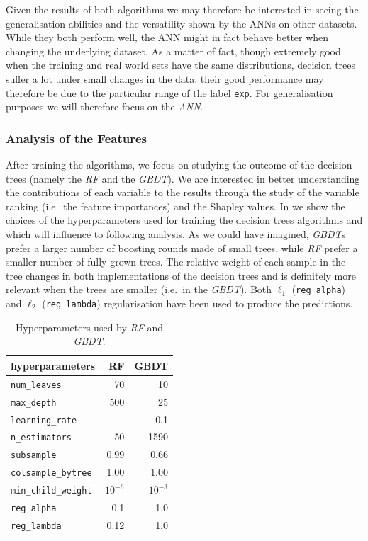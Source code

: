 Given the results of both algorithms we may therefore be interested in seeing the generalisation abilities and the versatility shown by the ANNs on other datasets.
While they both perform well, the ANN might in fact behave better when changing the underlying dataset.
As a matter of fact, though extremely good when the training and real world sets have the same distributions, decision trees suffer a lot under small changes in the data: their good performance may therefore be due to the particular range of the label \texttt{exp}.
For generalisation purposes we will therefore focus on the \emph{ANN}.


\subsubsection{Analysis of the Features}

After training the algorithms, we focus on studying the outcome of the decision trees (namely the \emph{RF} and the \emph{GBDT}).
We are interested in better understanding the contributions of each variable to the results through the study of the variable ranking (i.e.\ the feature importances) and the Shapley values.
In  we show the choices of the hyperparameters used for training the decision trees algorithms and which will influence to following analysis.
As we could have imagined, \emph{GBDT}s prefer a larger number of boosting rounds made of small trees, while \emph{RF} prefer a smaller number of fully grown trees.
The relative weight of each sample in the tree changes in both implementations of the decision trees and is definitely more relevant when the trees are smaller (i.e.\ in the \emph{GBDT}).
Both $\ell_1$ (\texttt{reg\_alpha}) and $\ell_2$ (\texttt{reg\_lambda}) regularisation have been used to produce the predictions.

\begin{table}[htbp]
  \centering
  \begin{tabular}{@{}lrr@{}}
      \toprule
      \textbf{hyperparameters}    & \textbf{RF} & \textbf{GBDT} \\
      \midrule
      \texttt{num\_leaves}        & 70          & 10            \\
      \texttt{max\_depth} 	  & 500         & 25            \\
      \texttt{learning\_rate}     & ---         & 0.1           \\
      \texttt{n\_estimators} 	  & 50          & 1590          \\
      \texttt{subsample} 	  & 0.99        & 0.66          \\
      \texttt{colsample\_bytree}  & 1.00        & 1.00          \\ \texttt{min\_child\_weight} & $10^{-6}$   & $10^{-3}$     \\
      \texttt{reg\_alpha} 	  & 0.1         & 1.0           \\
      \texttt{reg\_lambda}        & 0.12        & 1.0           \\
      \bottomrule
  \end{tabular}
  \caption{Hyperparameters used by \emph{RF} and \emph{GBDT}.}
  \label{tab:lumps:hyp}
\end{table}


